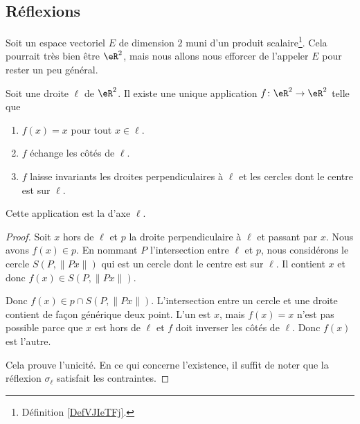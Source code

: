 \subsection{Réflexions}

Soit un espace vectoriel \( E\) de dimension \( 2\) muni d'un produit scalaire\footnote{Définition \ref{DefVJIeTFj}.}. Cela pourrait très bien être \( \eR^2\), mais nous allons nous efforcer de l'appeler \( E\) pour rester un peu général.

\begin{lemmaDef}        \label{DEFooLJKDooUaamen}
    Soit une droite \( \ell\) de \( \eR^2\). Il existe une unique application \( f\colon \eR^2\to \eR^2\) telle que
    \begin{enumerate}
        \item
            \( f(x)=x\) pour tout \( x\in \ell\).
        \item
            \( f\) échange les côtés de \( \ell\).
        \item
            \( f\) laisse invariants les droites perpendiculaires à \( \ell\) et les cercles dont le centre est sur \( \ell\).
    \end{enumerate}
    Cette application est la  d'axe \( \ell\).
\end{lemmaDef}

\begin{proof}
    Soit \( x\) hors de \( \ell\) et \( p\) la droite perpendiculaire à \( \ell\) et passant par \( x\). Nous avons \( f(x)\in p\). En nommant \( P\) l'intersection entre \( \ell\) et \( p\), nous considérons le cercle \( S(P,\| Px \|)\) qui est un cercle dont le centre est sur \( \ell\). Il contient \( x\) et donc \( f(x)\in S(P,\| Px \|)\).

    Donc \( f(x)\in p\cap S(P,\| Px \|)\). L'intersection entre un cercle et une droite contient de façon générique deux point. L'un est \( x\), mais \( f(x)=x\) n'est pas possible parce que \( x\) est hors de \( \ell\) et \( f\) doit inverser les côtés de \( \ell\). Donc \( f(x)\) est l'autre.

    Cela prouve l'unicité. En ce qui concerne l'existence, il suffit de noter que la réflexion \( \sigma_{\ell}\) satisfait les contraintes.
\end{proof}


